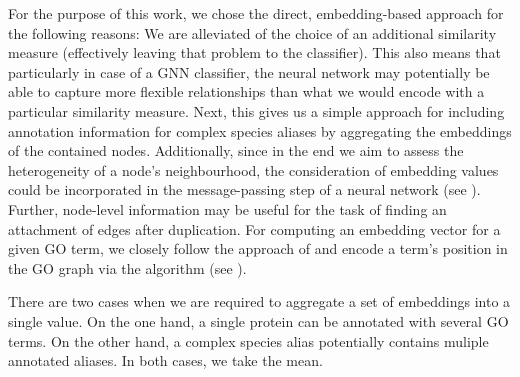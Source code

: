 \documentclass[
	fontsize=10pt, %
	twoside=false, %
	secnumdepth=1, %
]{kaobook}
\begin{document}
For the purpose of this work, we chose the direct, embedding-based approach for
the following reasons: We are alleviated of the choice of an additional
similarity measure (effectively leaving that problem to the classifier). This
also means that particularly in case of a GNN classifier, the neural network may
potentially be able to capture more flexible relationships than what we would
encode with a particular similarity measure. Next, this gives us a simple
approach for including annotation information for complex species aliases by
aggregating the embeddings of the contained nodes.
Additionally, since in the end we
aim to assess the heterogeneity of a node's neighbourhood, the consideration of
embedding values could be incorporated in the message-passing step of a neural
network (see ). Further, node-level information may be
useful for the task of finding an attachment of edges after duplication.
For computing an embedding vector for a given GO term, we closely follow the
approach of \citeauthor{zhong_GO2VecTransformingGO_2020}
\cite{zhong_GO2VecTransformingGO_2020} and encode a term's position in the GO
graph via the  algorithm (see ).





There are two cases when we are required to
aggregate a set of embeddings into a single value. On the one hand, a single
protein can be annotated with several GO terms. On the other hand, a complex
species alias potentially contains muliple annotated aliases. In both cases,
we take the mean.
\end{document}
